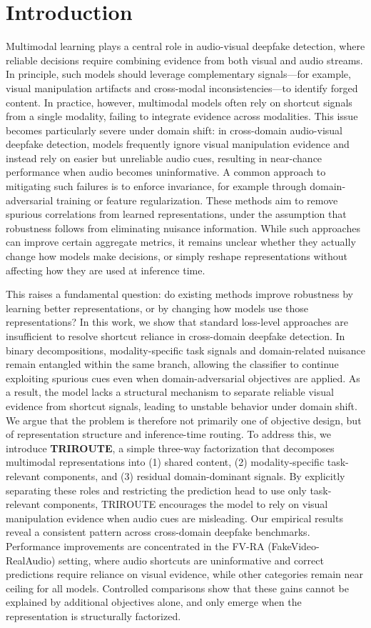 \documentclass{article}
\begin{document}
\section{Introduction}
Multimodal learning plays a central role in audio-visual deepfake detection, where reliable decisions require combining evidence from both visual and audio streams. In principle, such models should leverage complementary signals—for example, visual manipulation artifacts and cross-modal inconsistencies—to identify forged content. In practice, however, multimodal models often rely on shortcut signals from a single modality, failing to integrate evidence across modalities. This issue becomes particularly severe under domain shift: in cross-domain audio-visual deepfake detection, models frequently ignore visual manipulation evidence and instead rely on easier but unreliable audio cues, resulting in near-chance performance when audio becomes uninformative.
A common approach to mitigating such failures is to enforce invariance, for example through domain-adversarial training or feature regularization. These methods aim to remove spurious correlations from learned representations, under the assumption that robustness follows from eliminating nuisance information. While such approaches can improve certain aggregate metrics, it remains unclear whether they actually change how models make decisions, or simply reshape representations without affecting how they are used at inference time.

This raises a fundamental question: do existing methods improve robustness by learning better representations, or by changing how models use those representations?
In this work, we show that standard loss-level approaches are insufficient to resolve shortcut reliance in cross-domain deepfake detection. In binary decompositions, modality-specific task signals and domain-related nuisance remain entangled within the same branch, allowing the classifier to continue exploiting spurious cues even when domain-adversarial objectives are applied. As a result, the model lacks a structural mechanism to separate reliable visual evidence from shortcut signals, leading to unstable behavior under domain shift.
We argue that the problem is therefore not primarily one of objective design, but of representation structure and inference-time routing. To address this, we introduce \textbf{TRIROUTE}, a simple three-way factorization that decomposes multimodal representations into (1) shared content, (2) modality-specific task-relevant components, and (3) residual domain-dominant signals. By explicitly separating these roles and restricting the prediction head to use only task-relevant components, TRIROUTE encourages the model to rely on visual manipulation evidence when audio cues are misleading.
Our empirical results reveal a consistent pattern across cross-domain deepfake benchmarks. Performance improvements are concentrated in the FV-RA (FakeVideo-RealAudio) setting, where audio shortcuts are uninformative and correct predictions require reliance on visual evidence, while other categories remain near ceiling for all models. Controlled comparisons show that these gains cannot be explained by additional objectives alone, and only emerge when the representation is structurally factorized.
\end{document}
